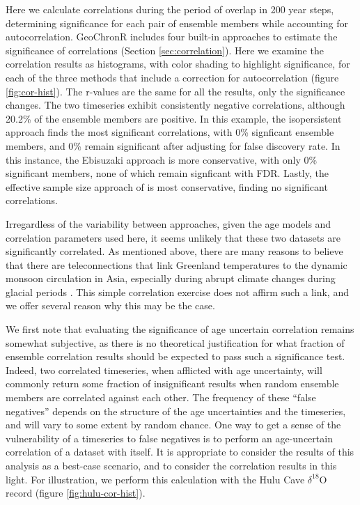 \documentclass[gchron, manuscript]{copernicus}
\begin{document}
Here we calculate correlations during the period of overlap in 200 year steps, determining significance for each pair of ensemble members while accounting for autocorrelation.
GeoChronR includes four built-in approaches to estimate the significance of correlations (Section \ref{sec:correlation}).
Here we examine the correlation results as histograms, with color shading to highlight significance, for each of the three methods that include a correction for autocorrelation (figure \ref{fig:cor-hist}).
The r-values are the same for all the results, only the significance changes.
The two timeseries exhibit consistently negative correlations, although 20.2\% of the ensemble members are positive.
In this example, the isopersistent approach finds the most significant correlations, with 0\% signficant ensemble members, and 0\% remain significant after adjusting for false discovery rate.
In this instance, the Ebisuzaki approach is more conservative, with only 0\% significant members, none of which remain signficant with FDR.
Lastly, the effective sample size approach of \citet{bretherton1999} is most conservative, finding no significant correlations.

Irregardless of the variability between approaches, given the age models and correlation parameters used here, it seems unlikely that these two datasets are significantly correlated.
As mentioned above, there are many reasons to believe that there are teleconnections that link Greenland temperatures to the dynamic monsoon circulation in Asia, especially during abrupt climate changes during glacial periods \citep[e.g.][]{liu2013links, duan2016onset, zhang2019asian}.
This simple correlation exercise does not affirm such a link, and we offer several reason why this may be the case.

We first note that evaluating the significance of age uncertain correlation remains somewhat subjective, as there is no theoretical justification for what fraction of ensemble correlation results should be expected to pass such a significance test. Indeed, two correlated timeseries, when afflicted with age uncertainty, will commonly return some fraction of insignificant results when random ensemble members are correlated against each other.
The frequency of these ``false negatives'' depends on the structure of the age uncertainties and the timeseries, and will vary to some extent by random chance. One way to get a sense of the vulnerability of a timeseries to false negatives is to perform an age-uncertain correlation of a dataset with itself.
It is appropriate to consider the results of this analysis as a best-case scenario, and to consider the correlation results in this light. For illustration, we perform this calculation with the Hulu Cave \(\delta^{18}\)O record (figure \ref{fig:hulu-cor-hist}).
\end{document}
